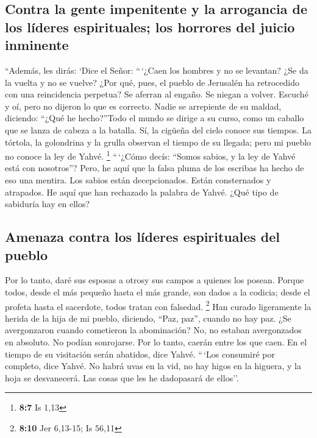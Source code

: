 \begin{paracol}{2}
\hypertarget{contra-la-gente-impenitente-y-la-arrogancia-de-los-luxedderes-espirituales-los-horrores-del-juicio-inminente}{%
\subsection{Contra la gente impenitente y la arrogancia de los líderes
espirituales; los horrores del juicio
inminente}\label{contra-la-gente-impenitente-y-la-arrogancia-de-los-luxedderes-espirituales-los-horrores-del-juicio-inminente}}

 ``Además, les dirás: `Dice el Señor: ``\,`¿Caen los
hombres y no se levantan? ¿Se da la vuelta y no se vuelve?
 ¿Por qué, pues, el pueblo de Jerusalén ha retrocedido con
una reincidencia perpetua? Se aferran al engaño. Se niegan a volver.
 Escuché y oí, pero no dijeron lo que es correcto. Nadie
se arrepiente de su maldad, diciendo: ``¿Qué he hecho?''Todo el mundo se
dirige a su curso, como un caballo que se lanza de cabeza a la batalla.
 Sí, la cigüeña del cielo conoce sus tiempos. La tórtola,
la golondrina y la grulla observan el tiempo de su llegada; pero mi
pueblo no conoce la ley de Yahvé. \footnote{\textbf{8:7} Is 1,13}
 ``\,`¿Cómo decís: ``Somos sabios, y la ley de Yahvé está
con nosotros''? Pero, he aquí que la falsa pluma de los escribas ha
hecho de eso una mentira.  Los sabios están decepcionados.
Están consternados y atrapados. He aquí que han rechazado la palabra de
Yahvé. ¿Qué tipo de sabiduría hay en ellos?

\hypertarget{amenaza-contra-los-luxedderes-espirituales-del-pueblo}{%
\subsection{Amenaza contra los líderes espirituales del
pueblo}\label{amenaza-contra-los-luxedderes-espirituales-del-pueblo}}

 Por lo tanto, daré sus esposas a otrosy sus campos a
quienes los posean. Porque todos, desde el más pequeño hasta el más
grande, son dados a la codicia; desde el profeta hasta el sacerdote,
todos tratan con falsedad. \footnote{\textbf{8:10} Jer 6,13-15; Is 56,11}
 Han curado ligeramente la herida de la hija de mi
pueblo, diciendo, ``Paz, paz'', cuando no hay paz.  ¿Se
avergonzaron cuando cometieron la abominación? No, no estaban
avergonzados en absoluto. No podían sonrojarse. Por lo tanto, caerán
entre los que caen. En el tiempo de su visitación serán abatidos, dice
Yahvé.  ``\,`Los consumiré por completo, dice Yahvé. No
habrá uvas en la vid, no hay higos en la higuera, y la hoja se
desvanecerá. Las cosas que les he dadopasará de ellos''.


\end{paracol}
